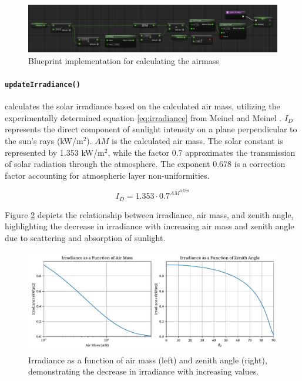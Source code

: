 \documentclass[draft, final]{vutinfth} %
\begin{document}
\begin{figure}
    \centering
    \includegraphics[width=\textwidth]{graphics/airmass-bp.jpg}
    \caption{Blueprint implementation for calculating the airmass}
    \label{fig:airmass-bp}
\end{figure}


\paragraph{\lstinline|updateIrradiance()|} calculates the solar irradiance based on the calculated air mass, utilizing the experimentally determined equation \ref{eq:irradiance} from Meinel and Meinel \cite{Meinel1976irradiance}. $I_D$ represents the direct component of sunlight intensity on a plane perpendicular to the sun's rays (kW/m$^2$). $AM$ is the calculated air mass. The solar constant is represented by 1.353 kW/m$^2$, while the factor 0.7 approximates the transmission of solar radiation through the atmosphere. The exponent 0.678 is a correction factor accounting for atmospheric layer non-uniformities.

\begin{equation} \label{eq:irradiance}
I_D = 1.353 \cdot 0.7^{AM^{0.678}}
\end{equation}

Figure \ref{fig:irradiance} depicts the relationship between irradiance, air mass, and zenith angle, highlighting the decrease in irradiance with increasing air mass and zenith angle due to scattering and absorption of sunlight.

\begin{figure}[h]
    \centering
    \includegraphics[width=\textwidth]{graphics/irradiance.pdf}
    \caption{Irradiance as a function of air mass (left) and zenith angle (right), demonstrating the decrease in irradiance with increasing values.}
    \label{fig:irradiance}
\end{figure}
\end{document}
